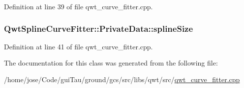 Definition at line 39 of file qwt\-\_\-curve\-\_\-fitter.\-cpp.

\hypertarget{class_qwt_spline_curve_fitter_1_1_private_data_a2a220c6b2e8d05557779d818e8ffb321}{
\subsubsection[{spline\-Size}]{ Qwt\-Spline\-Curve\-Fitter\-::\-Private\-Data\-::spline\-Size}}\label{class_qwt_spline_curve_fitter_1_1_private_data_a2a220c6b2e8d05557779d818e8ffb321}


Definition at line 41 of file qwt\-\_\-curve\-\_\-fitter.\-cpp.



The documentation for this class was generated from the following file\-:\begin{DoxyCompactItemize}
\item 
/home/jose/\-Code/gui\-Tau/ground/gcs/src/libs/qwt/src/\hyperlink{qwt__curve__fitter_8cpp}{qwt\-\_\-curve\-\_\-fitter.\-cpp}\end{DoxyCompactItemize}
